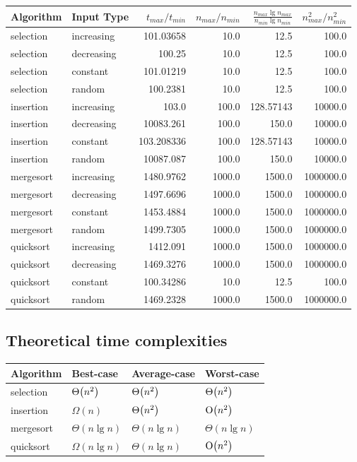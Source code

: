 \documentclass[11pt]{article}
\let\originalleft\left
\let\originalright\right
\renewcommand{\left}{\mathopen{}\mathclose\bgroup\originalleft}
\renewcommand{\right}{\aftergroup\egroup\originalright}
\begin{document}
\begin{center}
\begin{tabular}{llrrrr}
Algorithm & Input Type & \(t_{max}/t_{min}\) & \(n_{max}/n_{min}\) & \(\frac{n_{max} \lg n_{max}}{n_{min} \lg n_{min}}\) & \(n_{max}^2/n_{min}^2\)\\
\hline
selection & increasing & 101.03658 & 10.0 & 12.5 & 100.0\\
selection & decreasing & 100.25 & 10.0 & 12.5 & 100.0\\
selection & constant & 101.01219 & 10.0 & 12.5 & 100.0\\
selection & random & 100.2381 & 10.0 & 12.5 & 100.0\\
\hline
insertion & increasing & 103.0 & 100.0 & 128.57143 & 10000.0\\
insertion & decreasing & 10083.261 & 100.0 & 150.0 & 10000.0\\
insertion & constant & 103.208336 & 100.0 & 128.57143 & 10000.0\\
insertion & random & 10087.087 & 100.0 & 150.0 & 10000.0\\
\hline
mergesort & increasing & 1480.9762 & 1000.0 & 1500.0 & 1000000.0\\
mergesort & decreasing & 1497.6696 & 1000.0 & 1500.0 & 1000000.0\\
mergesort & constant & 1453.4884 & 1000.0 & 1500.0 & 1000000.0\\
mergesort & random & 1499.7305 & 1000.0 & 1500.0 & 1000000.0\\
\hline
quicksort & increasing & 1412.091 & 1000.0 & 1500.0 & 1000000.0\\
quicksort & decreasing & 1469.3276 & 1000.0 & 1500.0 & 1000000.0\\
quicksort & constant & 100.34286 & 10.0 & 12.5 & 100.0\\
quicksort & random & 1469.2328 & 1000.0 & 1500.0 & 1000000.0\\
\end{tabular}
\end{center}

\subsection{Theoretical time complexities}
\label{sec:org3fa29e7}

\begin{center}
\begin{tabular}{llll}
Algorithm & Best-case & Average-case & Worst-case\\
\hline
selection & \(\Theta\left(n^2\right)\) & \(\Theta\left(n^2\right)\) & \(\Theta\left(n^2\right)\)\\
insertion & \(\Omega(n)\) & \(\Theta\left(n^2\right)\) & \(\textrm{O}\left(n^2\right)\)\\
mergesort & \(\Theta(n \lg n)\) & \(\Theta(n \lg n)\) & \(\Theta(n \lg n)\)\\
quicksort & \(\Omega(n \lg n)\) & \(\Theta(n \lg n)\) & \(\textrm{O}\left(n^2\right)\)\\
\end{tabular}
\end{center}
\end{document}
